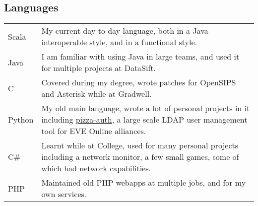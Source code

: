 \documentclass[a4paper]{article}
\begin{document}
\subsection*{Languages}
\begin{tabular}{ l p{14cm} }
Scala & My current day to day language, both in a Java interoperable style, and in a functional style.\\
Java & I am familiar with using Java in large teams, and used it for multiple projects at DataSift.\\
C & Covered during my degree, wrote patches for OpenSIPS and Asterisk while at Gradwell.\\
Python & My old main language, wrote a lot of personal projects in it including \href{https://github.com/andimiller/pizza-auth}{pizza-auth}, a large scale LDAP user management tool for EVE Online alliances.\\
C\# & Learnt while at College, used for many personal projects including a network monitor, a few small games, some of which had network capabilities.\\
PHP & Maintained old PHP webapps at multiple jobs, and for my own services.\\
\end{tabular}
\end{document}
